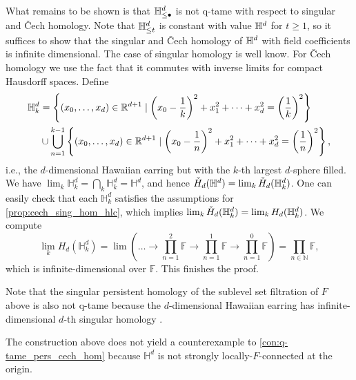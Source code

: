 What remains to be shown is that $\mathbb{H}^d_{\leq \bullet}$ is not q-tame with respect to singular and \v{C}ech homology.
Note that $\mathbb{H}^d_{\leq t}$ is constant with value $\mathbb{H}^d$ for $t \geq 1$, so it suffices to show that the singular and \v{C}ech homology of $\mathbb{H}^d$ with field coefficients is infinite dimensional.
The case of singular homology is well know.
For \v{C}ech homology we use the fact that it commutes with inverse limits for compact Hausdorff spaces.
Define 
\begin{align*}
\mathbb{H}^{d}_k&=\left\{(x_0,\dots,x_d)\in\mathbb{R}^{d+1}\mid \left(x_0-\frac{1}{k}\right)^2+x_1^2+\dots+x_d^2=\left(\frac{1}{k}\right)^2\right\}\\
&\cup\bigcup_{n=1}^{k-1}\left\{(x_0,\dots,x_d)\in\mathbb{R}^{d+1}\mid \left(x_0-\frac{1}{n}\right)^2+x_1^2+\dots+x_d^2=\left(\frac{1}{n}\right)^2\right\},
\end{align*}
i.e., the $d$-dimensional Hawaiian earring but with the $k$-th largest $d$-sphere filled.
We have $\lim_{k}\mathbb{H}^{d}_{k}=\bigcap_{k}\mathbb{H}^{d}_{k}=\mathbb{H}^{d}$, and hence $\check{H}_{d}(\mathbb{H}^{d}) = \lim_{k}\check{H}_{d}(\mathbb{H}^{d}_{k})$.
One can easily check that each $\mathbb{H}^{d}_{k}$ satisfies the assumptions for \cref{prop:cech_sing_hom_hlc}, which implies $\lim_{k}\check{H}_{d}(\mathbb{H}^{d}_{k})=\lim_{k}H_{d}(\mathbb{H}^{d}_{k})$.
We compute
\[
\lim_{k}H_{d}(\mathbb{H}^{d}_{k})=\lim\left(\dots\to \prod_{n=1}^2\mathbb{F}\to \prod_{n=1}^1\mathbb{F}\to \prod_{n=1}^0\mathbb{F}\right)=\prod_{n\in\mathbb{N}}\mathbb{F},
\]
which is infinite-dimensional over $\mathbb{F}$.
This finishes the proof.

\begin{rem}
Note that the singular persistent homology of the sublevel set filtration of $F$ above is also not q-tame because the $d$-dimensional Hawaiian earring has infinite-dimensional $d$-th singular homology \cite{Barratt.1962}. 
\end{rem}

\begin{rem}
The construction above does not yield a counterexample to \cref{con:q-tame_pers_cech_hom} because $\mathbb{H}^{d}$ is not strongly locally-$F$-connected at the origin.
\end{rem}